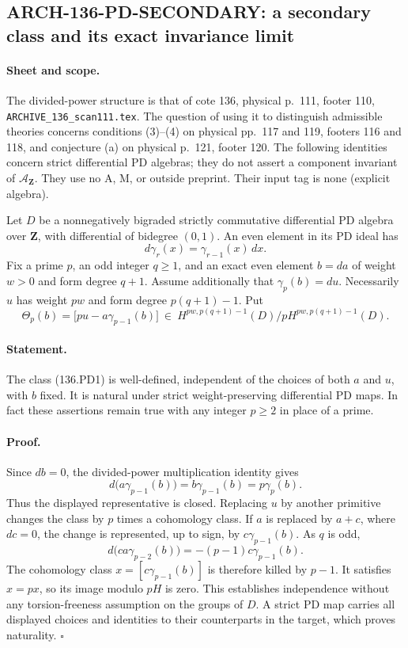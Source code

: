 \subsection{ARCH-136-PD-SECONDARY: a secondary class and its exact invariance limit}
\label{sec:arch136pdsecondary}

\paragraph{Sheet and scope.}
The divided-power structure is that of cote 136, physical p.~111,
footer 110, \texttt{ARCHIVE\_136\_scan111.tex}. The question of using
it to distinguish admissible theories concerns conditions (3)--(4)
on physical pp.~117 and 119, footers 116 and 118, and conjecture (a)
on physical p.~121, footer 120. The following identities concern
strict differential PD algebras; they do not assert a component
invariant of \(\mathcal A_{\mathbf Z}\). They use no A, M, or outside
preprint. Their input tag is none (explicit algebra).

Let \(D\) be a nonnegatively bigraded strictly commutative differential
PD algebra over \(\mathbf Z\), with differential of bidegree \((0,1)\).
An even element in its PD ideal has
\[
 d\gamma_r(x)=\gamma_{r-1}(x)\,dx.
\]
Fix a prime \(p\), an odd integer \(q\geq1\), and an exact even
element \(b=da\) of weight \(w>0\) and form degree \(q+1\).
Assume additionally that \(\gamma_p(b)=du\). Necessarily \(u\) has
weight \(pw\) and form degree \(p(q+1)-1\). Put
\[
 \Theta_p(b)=
 \bigl[p u-a\gamma_{p-1}(b)\bigr]
 \ \in\
 H^{pw,p(q+1)-1}(D)/
       pH^{pw,p(q+1)-1}(D).
 \tag{136.PD1}
\]

\paragraph{Statement.}
The class (136.PD1) is well-defined, independent of the choices of
both \(a\) and \(u\), with \(b\) fixed. It is natural under strict
weight-preserving differential PD maps. In fact these assertions
remain true with any integer \(p\geq2\) in place of a prime.

\paragraph{Proof.}
Since \(db=0\), the divided-power multiplication identity gives
\[
 d\bigl(a\gamma_{p-1}(b)\bigr)
       =b\gamma_{p-1}(b)=p\gamma_p(b).
\]
Thus the displayed representative is closed. Replacing \(u\) by
another primitive changes the class by \(p\) times a cohomology
class. If \(a\) is replaced by \(a+c\), where \(dc=0\), the change
is represented, up to sign, by \(c\gamma_{p-1}(b)\). As \(q\) is
odd,
\[
 d\bigl(ca\gamma_{p-2}(b)\bigr)
       =-(p-1)c\gamma_{p-1}(b).
\]
The cohomology class \(x=[c\gamma_{p-1}(b)]\) is therefore killed by
\(p-1\). It satisfies \(x=px\), so its image modulo \(pH\) is zero.
This establishes independence without any torsion-freeness
assumption on the groups of \(D\). A strict PD map carries all
displayed choices and identities to their counterparts in the
target, which proves naturality. \(\square\)

